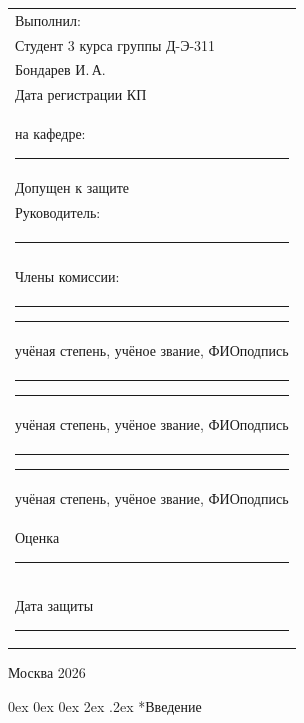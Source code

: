 \documentclass[14pt, a4paper]{extarticle}
\makeatletter
\renewcommand\section{\@startsection {section}{1}{\z@}%
    {0ex \@plus 0ex \@minus 0ex}%
    {2ex \@plus.2ex}%
    {\centering\normalfont\Large\bfseries}}
\makeatother
\begin{document}
\begin{flushright}
    \small
    \begin{tabular}{l}
        Выполнил:\\
        Студент 3 курса группы Д-Э-311\\
        Бондарев И.\,А.\\[0.5ex]
        Дата регистрации КП\\
        на кафедре: \rule{4cm}{0.4pt}\\[0.15cm]
        Допущен к защите\\[0.1cm]
        Руководитель:\\[0.1cm]
        \rule{6cm}{0.4pt}\\
        \hspace*{0.5cm}{\footnotesize учёная степень, учёное звание, ФИО}\\[0.25cm]
        Члены комиссии:\\[0.1cm]
        \rule{6cm}{0.4pt}\hfill\rule{2cm}{0.4pt}\\
        {\footnotesize учёная степень, учёное звание, ФИО}\hfill{\footnotesize подпись}\\[0.1cm]
        \rule{6cm}{0.4pt}\hfill\rule{2cm}{0.4pt}\\
        {\footnotesize учёная степень, учёное звание, ФИО}\hfill{\footnotesize подпись}\\[0.1cm]
        \rule{6cm}{0.4pt}\hfill\rule{2cm}{0.4pt}\\
        {\footnotesize учёная степень, учёное звание, ФИО}\hfill{\footnotesize подпись}\\[0.25cm]
        Оценка \rule{6cm}{0.4pt}\\[0.15cm]
        Дата защиты \rule{5cm}{0.4pt}
    \end{tabular}
\end{flushright}

\vspace{0.3cm}
\begin{center}
    Москва 2026
\end{center}


\newpage
\tableofcontents


\newpage
{}
\section*{Введение}
\end{document}
